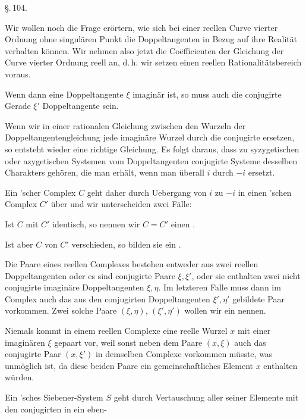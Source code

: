 
\S.\,104.


Wir wollen noch die Frage erörtern, wie sich bei einer
reellen Curve vierter Ordnung ohne singulären Punkt die Doppeltangenten
in Bezug auf ihre Realität verhalten können. Wir
nehmen also jetzt die Co\"efficienten der Gleichung der Curve
vierter Ordnung reell an, d.\,h. wir setzen einen reellen Rationalitätsbereich
voraus.

Wenn dann eine Doppeltangente $\xi$ imaginär ist, so muss
auch die conjugirte Gerade $\xi'$ Doppeltangente sein.

Wenn wir in einer rationalen Gleichung zwischen den Wurzeln
der Doppeltangentengleichung jede imaginäre Wurzel durch
die conjugirte ersetzen, so entsteht wieder eine richtige Gleichung.
Es folgt daraus, dass zu syzygetischen oder azygetischen
Systemen vom %
Doppeltangenten conjugirte Systeme desselben
Charakters gehören, die man erhält, wenn man überall $i$ durch
$-i$ ersetzt.

Ein 'scher Complex $C$ geht daher durch Uebergang
von $i$ zu $-i$ in einen 'schen Complex $C'$ über und wir
unterscheiden zwei Fälle:

Ist $C$ mit $C'$ identisch, so nennen wir $C = C'$ einen .

Ist aber $C$ von $C'$ verschieden, so bilden sie ein .

Die Paare eines reellen Complexes bestehen entweder aus
zwei reellen Doppeltangenten oder es sind conjugirte Paare $\xi, \xi'$,
oder sie enthalten zwei nicht conjugirte imaginäre Doppeltangenten
$\xi, \eta$. Im letzteren Falle muss dann im Complex auch
das aus den conjugirten Doppeltangenten $\xi', \eta'$ gebildete Paar
vorkommen. Zwei solche Paare $(\xi, \eta)$, $(\xi', \eta')$ wollen wir ein
 nennen.

Niemals kommt in einem reellen Complexe eine reelle
Wurzel $x$ mit einer imaginären $\xi$ gepaart vor, weil sonst neben
dem Paare $(x, \xi)$ auch das conjugirte Paar $(x, \xi')$ in demselben
Complexe vorkommen müsste, was unmöglich ist, da diese beiden
Paare ein gemeinschaftliches Element $x$ enthalten würden.

Ein 'sches Siebener-System $S$ geht durch Vertauschung
aller seiner Elemente mit den conjugirten in ein eben-
